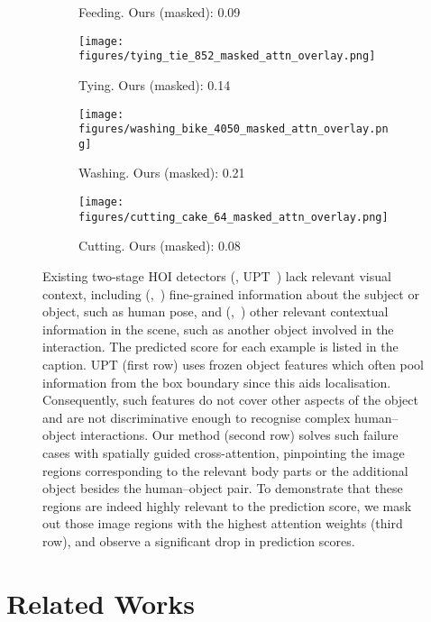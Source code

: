 \documentclass[10pt,twocolumn,letterpaper]{article}
\begin{document}
\begin{figure*}[t]
\begin{subfigure}[t]{0.245\linewidth}
      \caption{Feeding. Ours (masked): 0.09}
      \label{fig:comp_1_blocked_ours}
   \end{subfigure}\hfill
   \begin{subfigure}[t]{0.245\linewidth}
      \texttt{[image: figures/tying\_tie\_852\_masked\_attn\_overlay.png]}
      \caption{Tying. Ours (masked): 0.14}
      \label{fig:comp_3_blocked_ours}
   \end{subfigure}\hfill
   \begin{subfigure}[t]{0.245\linewidth}
      \centering
      \texttt{[image: figures/washing\_bike\_4050\_masked\_attn\_overlay.png]}
      \caption{Washing. Ours (masked): 0.21}
      \label{fig:comp_2_blocked_ours}
   \end{subfigure}\hfill
   \begin{subfigure}[t]{0.245\linewidth}
      \texttt{[image: figures/cutting\_cake\_64\_masked\_attn\_overlay.png]}
      \caption{Cutting. Ours (masked): 0.08}
      \label{fig:comp_4_blocked_ours}
   \end{subfigure}\vspace{5px}
   \caption{
   	Existing two-stage HOI detectors (\eg, UPT~\cite{upt}) lack relevant visual context, including (,~) fine-grained information about the subject or object, such as human pose, and (,~) other relevant contextual information in the scene, such as another object involved in the interaction. The predicted score for each example is listed in the caption. UPT (first row) uses frozen object features which often pool information from the box boundary since this aids localisation. Consequently, such features do not cover other aspects of the object and are not discriminative enough to recognise complex human--object interactions. Our method (second row) solves such failure cases with spatially guided cross-attention, pinpointing the image regions corresponding to the relevant body parts or the additional object besides the human--object pair. To demonstrate that these regions are indeed highly relevant to the prediction score, we mask out those image regions with the highest attention weights (third row), and observe a significant drop in prediction scores.}
   \label{fig:comp}
\end{figure*}

\section{Related Works}
\end{document}
